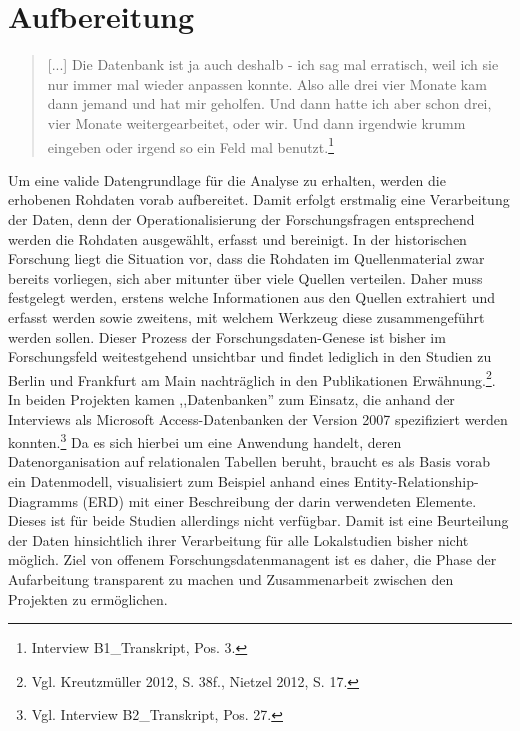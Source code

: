 \section{Aufbereitung}

\begin{quote}
    [...] Die Datenbank ist ja auch deshalb - ich sag mal erratisch, weil ich sie nur immer mal wieder anpassen konnte. Also alle drei vier Monate kam dann jemand und hat mir geholfen. Und dann hatte ich aber schon drei, vier Monate weitergearbeitet, oder wir. Und dann irgendwie krumm eingeben oder irgend so ein Feld mal benutzt.\footnote{Interview B1\_Transkript, Pos. 3.}
\end{quote}

Um eine valide Datengrundlage für die Analyse zu erhalten, werden die erhobenen Rohdaten vorab aufbereitet. Damit erfolgt erstmalig eine Verarbeitung der Daten, denn der Operationalisierung der Forschungsfragen entsprechend werden die Rohdaten ausgewählt, erfasst und bereinigt. In der historischen Forschung liegt die Situation vor, dass die Rohdaten im Quellenmaterial zwar bereits vorliegen, sich aber mitunter über viele Quellen verteilen. Daher muss festgelegt werden, erstens welche Informationen aus den Quellen extrahiert und erfasst werden sowie zweitens, mit welchem Werkzeug diese zusammengeführt werden sollen. Dieser Prozess der Forschungsdaten-Genese ist bisher im Forschungsfeld weitestgehend unsichtbar und findet lediglich in den Studien zu Berlin und Frankfurt am Main nachträglich in den Publikationen Erwähnung.\footnote{Vgl. Kreutzmüller 2012, S. 38f., Nietzel 2012, S. 17.}. In beiden Projekten kamen ,,Datenbanken'' zum Einsatz, die anhand der Interviews als Microsoft Access-Datenbanken der Version 2007 spezifiziert werden konnten.\footnote{Vgl. Interview B2\_Transkript, Pos. 27.} Da es sich hierbei um eine Anwendung handelt, deren Datenorganisation auf relationalen Tabellen beruht, braucht es als Basis vorab ein Datenmodell, visualisiert zum Beispiel anhand eines Entity-Relationship-Diagramms (ERD) mit einer Beschreibung der darin verwendeten Elemente. Dieses ist für beide Studien allerdings nicht verfügbar. Damit ist eine Beurteilung der Daten hinsichtlich ihrer Verarbeitung für alle Lokalstudien bisher nicht möglich. Ziel von offenem Forschungsdatenmanagent ist es daher, die Phase der Aufarbeitung transparent zu machen und Zusammenarbeit zwischen den Projekten zu ermöglichen. 

